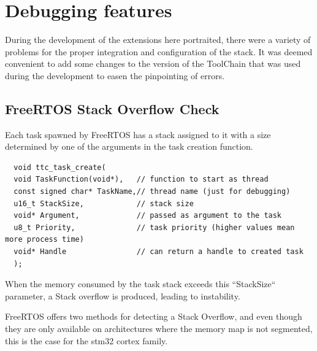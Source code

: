 

\chapter {Debugging features}
\label{sec:Debugging}

During the development of the extensions here portraited, there were a variety of problems for the proper integration and configuration of the stack. It was deemed convenient to add some changes to the version of the ToolChain that was used during the development to easen the pinpointing of errors.

\section {FreeRTOS Stack Overflow Check}
\label{sec:FreeRTOS Stack Overflow}

Each task spawned by FreeRTOS has a stack assigned to it with a size determined by one of the arguments in the task creation function.

\begin{lstlisting}
  void ttc_task_create(
  void TaskFunction(void*),   // function to start as thread
  const signed char* TaskName,// thread name (just for debugging)
  u16_t StackSize,            // stack size
  void* Argument,             // passed as argument to the task
  u8_t Priority,              // task priority (higher values mean more process time)
  void* Handle                // can return a handle to created task
  );
\end{lstlisting}

When the memory consumed by the task stack exceeds this ``StackSize`` parameter, a Stack overflow is produced, leading to instability.

FreeRTOS offers two methods for detecting a Stack Overflow, and even though they are only available on architectures where the memory map is not segmented, this is the case for the stm32 cortex family.

